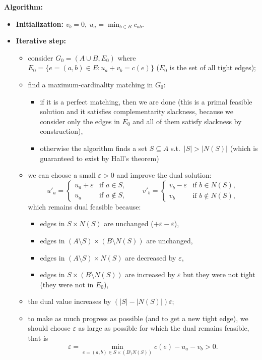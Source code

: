\medskip
\noindent\textbf{Algorithm:}
\begin{itemize}
  \item \textbf{Initialization:} $v_b=0,\ u_a=\min_{b\in B}c_{ab}$.
  \item \textbf{Iterative step:}
  \begin{itemize}
    \item consider $G_0=(A\cup B,E_0)$ where $E_0=\{e=(a,b)\in E: u_a+v_b=c(e)\}$ ($E_0$ is the
      set of all tight edges);
    \item find a maximum-cardinality matching in $G_0$:
    \begin{itemize}
      \item if it is a perfect matching, then we are done (this is a primal feasible solution and
        it satisfies complementarity slackness, because we consider only the edges in $E_0$ and
        all of them satisfy slackness by construction),
      \item otherwise the algorithm finds a set $S\subseteq A$ s.t.\ $|S|>|N(S)|$ (which is
        guaranteed to exist by Hall's theorem)
    \end{itemize}
    \item we can choose a small $\varepsilon>0$ and improve the dual solution:
    \[
      u'_a=\begin{cases}u_a+\varepsilon & \text{if } a\in S,\\ u_a & \text{if } a\notin S,\end{cases}
      \qquad
      v'_b=\begin{cases}v_b-\varepsilon & \text{if } b\in N(S),\\ v_b & \text{if } b\notin N(S),\end{cases}
    \]
    which remains dual feasible because:
    \begin{itemize}
      \item edges in $S\times N(S)$ are unchanged ($+\varepsilon-\varepsilon$),
      \item edges in $(A\setminus S)\times(B\setminus N(S))$ are unchanged,
      \item edges in $(A\setminus S)\times N(S)$ are decreased by $\varepsilon$,
      \item edges in $S\times(B\setminus N(S))$ are increased by $\varepsilon$ but they were not
        tight (they were not in $E_0$),
    \end{itemize}
    \item the dual value increases by $(|S|-|N(S)|)\varepsilon$;
    \item to make as much progress as possible (and to get a new tight edge), we should choose
      $\varepsilon$ as large as possible for which the dual remains feasible, that is
      \[
        \varepsilon=\min_{e=(a,b)\in S\times(B\setminus N(S))}c(e)-u_a-v_b>0.
      \]
  \end{itemize}
\end{itemize}

